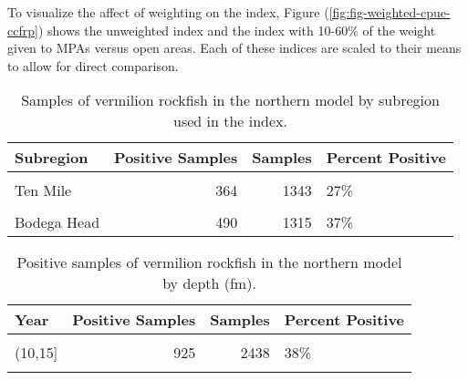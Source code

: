 \documentclass[
]{article}
\begin{document}
To visualize the affect of weighting on the index, Figure (\ref{fig:fig-weighted-cpue-ccfrp})
shows the unweighted index and the index with 10-60\% of the weight given to MPAs versus
open areas. Each of these indices are scaled to their means to allow for direct comparison.

\newpage

\begin{table}

\caption{\label{tab:tab-region-ccfrp}Samples of vermilion rockfish in the northern model by subregion used in the index.}
\centering
\begin{tabular}[t]{lrrl}
\toprule
Subregion & Positive Samples & Samples & Percent Positive\\
\midrule
\cellcolor{gray!6}{South Cape Mendocino} & \cellcolor{gray!6}{474} & \cellcolor{gray!6}{1854} & \cellcolor{gray!6}{26\%}\\
Ten Mile & 364 & 1343 & 27\%\\
\cellcolor{gray!6}{Stewarts Point} & \cellcolor{gray!6}{599} & \cellcolor{gray!6}{932} & \cellcolor{gray!6}{64\%}\\
Bodega Head & 490 & 1315 & 37\%\\
\bottomrule
\end{tabular}
\end{table}

\begin{table}

\caption{\label{tab:tab-depth-ccfrp}Positive samples of vermilion rockfish in the northern model by depth (fm).}
\centering
\begin{tabular}[t]{lrrl}
\toprule
Year & Positive Samples & Samples & Percent Positive\\
\midrule
\cellcolor{gray!6}{(0,10]} & \cellcolor{gray!6}{356} & \cellcolor{gray!6}{1589} & \cellcolor{gray!6}{22\%}\\
(10,15] & 925 & 2438 & 38\%\\
\cellcolor{gray!6}{(15,20]} & \cellcolor{gray!6}{646} & \cellcolor{gray!6}{1417} & \cellcolor{gray!6}{46\%}\\
\bottomrule
\end{tabular}
\end{table}
\end{document}
